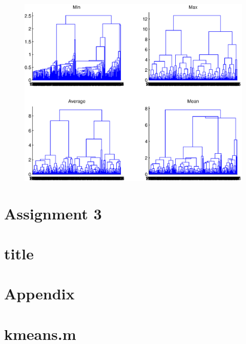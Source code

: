 \documentclass[10pt]{article}
\begin{document}
\subsection{}
\begin{figure}[b]
	\includegraphics[width=\columnwidth]{Ass2_2.eps}
	\caption{}
	\label{fig2b}
\end{figure}

\subsection{}

\section*{Assignment 3}
\section{title}

\newpage
\section*{Appendix}
\appendix
\section{kmeans.m}
{\label{Minkowski}}
\end{document}
